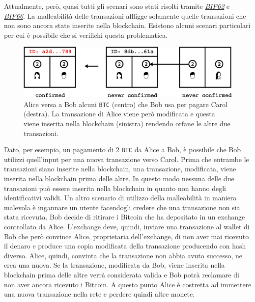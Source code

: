 Attualmente, però, quasi tutti gli scenari sono stati risolti tramite \href{https://en.bitcoin.it/wiki/BIP_0062}{\textit{BIP62}} e \href{https://en.bitcoin.it/wiki/BIP_0066}{\textit{BIP66}}.\newline
La malleabilità delle transazioni affligge solamente quelle transazioni che non sono ancora state inserite nella blockchain. Esistono alcuni scenari particolari per cui è possibile che si verifichi questa problematica.
\begin{figure}[H]
    \centering
    \includegraphics[width=\textwidth]{images/malleability.png}
    \caption{Alice versa a Bob alcuni \texttt{BTC} (centro) che Bob usa per pagare Carol (destra). La transazione di Alice viene però modificata e questa viene inserita nella blockchain (sinistra) rendendo orfane le altre due transazioni.\cite{owning}}
\end{figure}
Dato, per esempio, un pagamento di $2$ \texttt{BTC} da Alice a Bob, è possibile che Bob utilizzi quell'input per una nuova transazione verso Carol. Prima che entrambe le transazioni siano inserite nella blockchain, una transazione, modificata, viene inserita nella blockchain prima delle altre. In questo modo nessuna delle due transazioni può essere inserita nella blockchain in quanto non hanno degli identificativi validi.\newline
Un altro scenario di utilizzo della malleabilità in maniera malevola è ingannare un utente facendogli credere che una transazione non sia stata ricevuta. Bob decide di ritirare i Bitcoin che ha depositato in un exchange controllato da Alice. L'exchange deve, quindi, inviare una transazione al wallet di Bob che però convince Alice, proprietaria dell'exchange, di non aver mai ricevuto il denaro e produce una copia modificata della transazione producendo con hash diverso. Alice, quindi, convinta che la transazione non abbia avuto successo, ne crea una nuova. Se la transazione, modificata da Bob, viene inserita nella blockchain prima delle altre verrà considerata valida e Bob potrà reclamare di non aver ancora ricevuto i Bitcoin. A questo punto Alice è costretta ad immettere una nuova transazione nella rete e perdere quindi altre monete.\newline
